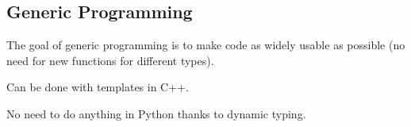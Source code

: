 \subsection{Generic Programming}
The goal of generic programming is to make code as widely usable as possible (no need for new functions for different types).

Can be done with templates in C++.

No need to do anything in Python thanks to dynamic typing.
